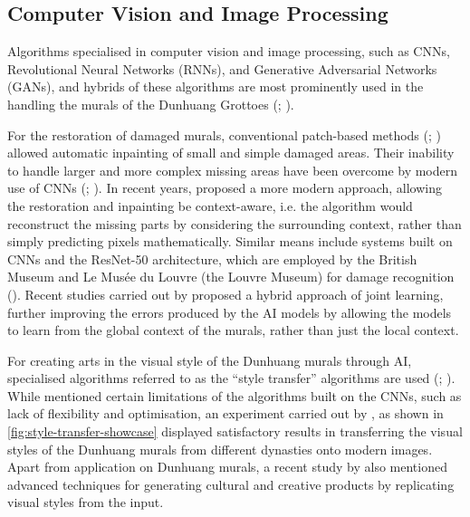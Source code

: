 \subsection{Computer Vision and Image Processing}
\label{sec:computer-vision-image-processing}

Algorithms specialised in computer vision and image processing, such as CNNs, Revolutional Neural Networks
(RNNs), and Generative Adversarial Networks (GANs), and hybrids of these algorithms are most prominently
used in the handling the murals of the Dunhuang Grottoes (;
).

For the restoration of damaged murals, conventional patch-based methods
(; )
allowed automatic inpainting of small and simple damaged areas. Their inability to handle larger and more complex
missing areas have been overcome by modern use of CNNs (;
).
In recent years,  proposed a more modern approach,
allowing the restoration and inpainting be context-aware, i.e. the algorithm would reconstruct the missing parts
by considering the surrounding context, rather than simply predicting pixels mathematically.
Similar means include systems built on CNNs and the ResNet-50 architecture, which are employed by the British
Museum and Le Musée du Louvre (the Louvre Museum) for damage recognition
().
Recent studies carried out by  proposed a hybrid approach of joint
learning, further improving the errors produced by the AI models by allowing the models to learn from the global
context of the murals, rather than just the local context.

For creating arts in the visual style of the Dunhuang murals through AI, specialised algorithms referred to as
the ``style transfer'' algorithms are used (;
). While  mentioned certain limitations of the
algorithms built on the CNNs, such as lack of flexibility and optimisation, an experiment carried out by 
, as shown in \cref{fig:style-transfer-showcase}
displayed satisfactory results in transferring
the visual styles of the Dunhuang murals from different dynasties onto modern images.
Apart from application on Dunhuang murals,
a recent study by  also mentioned advanced techniques for generating
cultural and creative products by replicating visual styles from the input.

